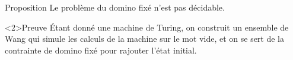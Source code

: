 \documentclass{beamer}
\begin{document}
    \begin{frame}
    
    \begin{block}{Proposition}
        Le problème du domino fixé n'est pas décidable.
    \end{block}
    
    \begin{exampleblock}<2>{Preuve}
        Étant donné une machine de Turing, on construit un ensemble de Wang qui simule les calculs de la machine sur le mot vide, et on se sert de la contrainte de domino fixé pour rajouter l'état initial.
    \end{exampleblock}
    
    \end{frame}
    
    \begin{frame}
        

\end{frame}
\end{document}
